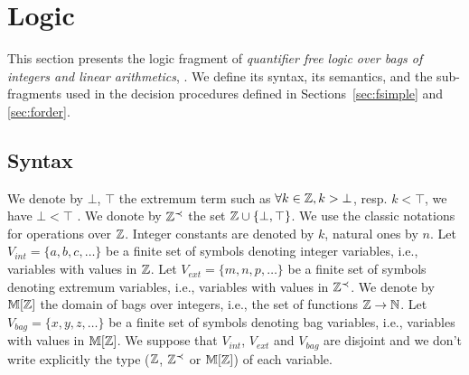 
\section{Logic \QFBILIA}
\label{sec:logic}

This section presents the logic fragment of \emph{quantifier free logic over bags of integers and linear arithmetics}, \QFBILIA.
We define its syntax, its semantics, and the sub-fragments used in the decision procedures defined in Sections~\ref{sec:fsimple} and \ref{sec:forder}.

\subsection{Syntax}
\label{ssec:syn}

We denote by $\bot$, $\top$ the extremum term such as $\forall k \in \mathbb{Z}, k > \bot$, resp. $k < \top$, we have $\bot < \top$ \cite{piskac2010decision}.
We donote by $\mathbb{Z}^{\prec}$ the set $\mathbb{Z} \cup \{\bot,\top\}$.
We use the classic notations for operations over $\mathbb{Z}$.
Integer constants are denoted by $k$, natural ones by $n$.
Let $V_{int}=\{a,b,c,\ldots\}$ be a finite set of symbols denoting integer variables, i.e., variables with values in $\mathbb{Z}$.
Let $V_{ext}=\{m,n,p,\ldots\}$ be a finite set of symbols denoting extremum variables, i.e., variables with values in $\mathbb{Z}^{\prec}$.
We denote by $\mathbb{M}[\mathbb{Z}]$ the domain of bags over integers, i.e.,
the set of functions $\mathbb{Z}\rightarrow\mathbb{N}$.
Let $V_{bag}=\{x,y,z,\ldots\}$ be a finite set of symbols denoting bag variables, i.e., variables with values in $\mathbb{M}[\mathbb{Z}]$.
We suppose that $V_{int}$, $V_{ext}$ and $V_{bag}$ are disjoint and we don't write explicitly the type ($\mathbb{Z}$, $\mathbb{Z}^{\prec}$ or $\mathbb{M}[\mathbb{Z}]$) of each variable.



